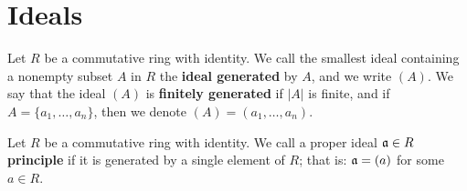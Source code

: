 \section{Ideals}
\label{section_5.4}

\begin{definition}
  Let $R$ be a commutative ring with identity. We call the smallest ideal
  containing a nonempty subset $A$ in $R$ the  \textbf{ideal generated} by
  $A$, and we write $(A)$. We say that the ideal $(A)$ is
  \textbf{finitely generated} if $|A|$ is finite, and if
  $A=\{a_1, \dots, a_n\}$, then we denote $(A)=(a_1, \dots, a_n)$.
\end{definition}

\begin{definition}
  Let $R$ be a commutative ring with identity. We call a proper ideal
   $\mathfrak{a} \in R$ \textbf{principle} if it is generated by a single
   element of $R$; that is:  $\mathfrak{a}=(a)$ for some $a \in R$.
\end{definition}

